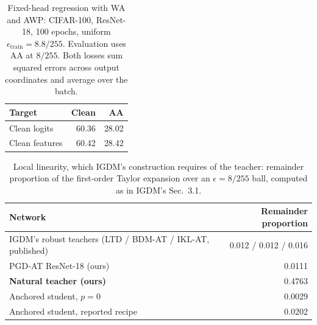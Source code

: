 \begin{table}[!htbp]
  \centering \small \setlength{\tabcolsep}{6pt}
  \caption{Fixed-head regression with WA and AWP: CIFAR-100, ResNet-18, 100 epochs,
  uniform $\epsilon_{\mathrm{train}}=8.8/255$. Evaluation uses AA at $8/255$.
  Both losses sum squared errors across output coordinates and average over the batch.}
  \label{tab:regression_stack}
  \begin{tabular}{lrr}
    \toprule
    Target & Clean & AA \\
    \midrule
    Clean logits & 60.36 & 28.02 \\
    Clean features & 60.42 & 28.42 \\
    \bottomrule
  \end{tabular}
\end{table}

\begin{table}[!htbp]
  \centering \small \setlength{\tabcolsep}{4.5pt}
  \caption{Local linearity, which IGDM's construction requires of the teacher: remainder proportion of
  the first-order Taylor expansion over an $\epsilon=8/255$ ball, computed as in IGDM's Sec.~3.1.}
  \label{tab:linearity}
  \begin{tabular}{lr}
    \toprule
    Network & Remainder proportion \\
    \midrule
    IGDM's robust teachers (LTD / BDM-AT / IKL-AT, published) & 0.012 / 0.012 / 0.016 \\
    PGD-AT ResNet-18 (ours)          & 0.0111 \\
    \textbf{Natural teacher (ours)}  & 0.4763 \\
    Anchored student, $p=0$          & 0.0029 \\
    Anchored student, reported recipe & 0.0202 \\
    \bottomrule
  \end{tabular}
\end{table}

